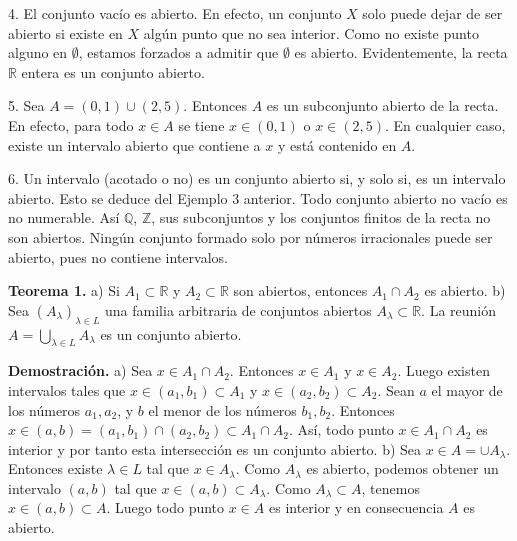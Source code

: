 \documentclass[12pt,oneside]{book}
\begin{document}
4. El conjunto vacío es abierto. En efecto, un conjunto \(X\) solo puede dejar de ser abierto si existe en \(X\) algún punto que no sea interior. Como no existe punto alguno en \(\emptyset\), estamos forzados a admitir que \(\emptyset\) es abierto. Evidentemente, la recta \(\mathbb{R}\) entera es un conjunto abierto.

5. Sea \(A = (0,1) \cup (2,5)\). Entonces \(A\) es un subconjunto abierto de la recta. En efecto, para todo \(x \in A\) se tiene \(x \in (0,1)\) o \(x \in (2,5)\). En cualquier caso, existe un intervalo abierto que contiene a \(x\) y está contenido en \(A\).

6. Un intervalo (acotado o no) es un conjunto abierto si, y solo si, es un intervalo abierto. Esto se deduce del Ejemplo 3 anterior. Todo conjunto abierto no vacío es no numerable. Así \(\mathbb{Q}\), \(\mathbb{Z}\), sus subconjuntos y los conjuntos finitos de la recta no son abiertos. Ningún conjunto formado solo por números irracionales puede ser abierto, pues no contiene intervalos.

\textbf{Teorema 1.} a) Si \(A_1 \subset \mathbb{R}\) y \(A_2 \subset \mathbb{R}\) son abiertos, entonces \(A_1 \cap A_2\) es abierto.
b) Sea \((A_\lambda)_{\lambda \in L}\) una familia arbitraria de conjuntos abiertos \(A_\lambda \subset \mathbb{R}\). La reunión \(A = \bigcup_{\lambda \in L} A_\lambda\) es un conjunto abierto.

\textbf{Demostración.} a) Sea \(x \in A_1 \cap A_2\). Entonces \(x \in A_1\) y \(x \in A_2\). Luego existen intervalos tales que \(x \in (a_1, b_1) \subset A_1\) y \(x \in (a_2, b_2) \subset A_2\). Sean \(a\) el mayor de los números \(a_1, a_2\), y \(b\) el menor de los números \(b_1, b_2\). Entonces \(x \in (a, b) = (a_1, b_1) \cap (a_2, b_2) \subset A_1 \cap A_2\). Así, todo punto \(x \in A_1 \cap A_2\) es interior y por tanto esta intersección es un conjunto abierto.
b) Sea \(x \in A = \cup A_\lambda\). Entonces existe \(\lambda \in L\) tal que \(x \in A_\lambda\). Como \(A_\lambda\) es abierto, podemos obtener un intervalo \((a, b)\) tal que \(x \in (a, b) \subset A_\lambda\). Como \(A_\lambda \subset A\), tenemos \(x \in (a, b) \subset A\). Luego todo punto \(x \in A\) es interior y en consecuencia \(A\) es abierto.
\end{document}
